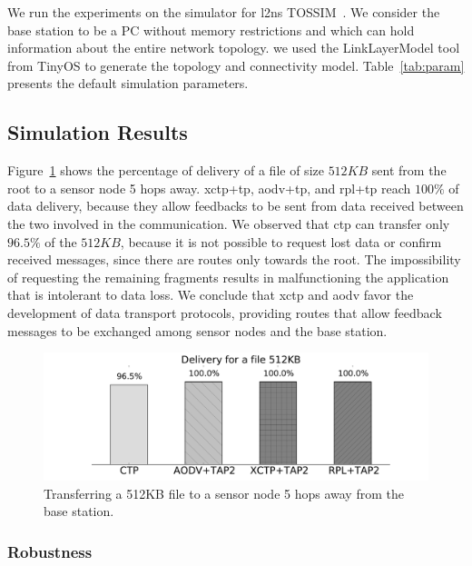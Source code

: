 We run the experiments on the simulator for \ac{l2ns} TOSSIM~\cite{tossim}. We consider the base station to be a PC without memory restrictions and which can hold information about the entire network topology. we used the LinkLayerModel tool from TinyOS to generate the topology and connectivity model. Table~\ref{tab:param} presents the default simulation parameters.





\subsection{Simulation Results}
\label{sec:simulation-results}

Figure~\ref{fig:delivery-512KB} shows the percentage of delivery of a file of
size $512KB$ sent from the root to a sensor node 5 hops away. \ac{xctp}+\ac{tp}, \ac{aodv}+\ac{tp}, and \ac{rpl}+\ac{tp} reach $100\%$ of data delivery, because they allow
feedbacks to be sent from data received between the two involved in the
communication. We observed that \ac{ctp} can transfer only $96.5\%$ of the
$512KB$, because it is not possible to request lost data or confirm received
messages, since there are routes only towards the root. The impossibility of
requesting the remaining fragments results in malfunctioning the application
that is intolerant to data loss. We conclude that \ac{xctp} and \ac{aodv} favor
the development of data transport protocols, providing routes that allow
feedback messages to be exchanged among sensor nodes and the base station.

\begin{figure}[ht]
\centerline{
    \includegraphics[width=0.8\linewidth]{img/entrega-512KB}
} \caption{Transferring a 512KB file to a sensor node 5 hops away
from the base station.} \label{fig:delivery-512KB}
\end{figure}

\subsubsection{Robustness}
\label{sec:robustness}

